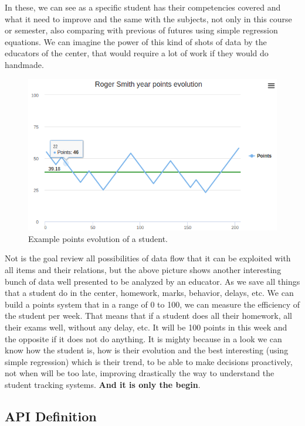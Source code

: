 \noindent In these, we can see as a specific student has their competencies covered and
what it need to improve and the same with the subjects, not only in this course
or semester, also comparing with previous of futures using simple regression
equations. We can imagine the power of this kind of shots of data by the educators
of the center, that would require a lot of work if they would do handmade.

\begin{figure}[H]
  \includegraphics[scale=0.47]{img/graphics/evolution.png}
  \centering
  \caption{Example points evolution of a student.}
\end{figure}

\noindent Not is the goal review all possibilities of data flow that it can be exploited
with all items and their relations, but the above picture shows another interesting
bunch of data well presented to be analyzed by an educator. As we save all things
that a student do in the center, homework, marks, behavior, delays, etc. We can build
a points system that in a range of 0 to 100, we can measure the efficiency of the
student per week. That means that if a student does all their homework, all their
exams well, without any delay, etc. It will be 100 points in this week and the
opposite if it does not do anything.
\intro
It is mighty because in a look we can know how the student is, how is their
evolution and the best interesting (using simple regression) which is their trend,
to be able to make decisions proactively, not when will be too late, improving
drastically the way to understand the student tracking systems.
\textbf{And it is only the begin}.

\subsection{API Definition}

